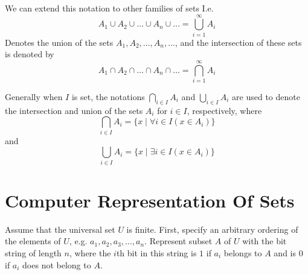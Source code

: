 \documentclass[12pt letter]{report}
\begin{document}

We can extend this notation to other families of sets I.e.
\[
	A_1 \cup A_2 \cup \ldots \cup A_n \cup \ldots = \bigcup_{i = 1} ^{\infty}A_i
\]
Denotes the union of the sets $A_1,A_2,\ldots,A_n,\ldots$, and the intersection of these sets is denoted by
\[
	A_1 \cap A_2 \cap \ldots \cap A_n \cap \ldots = \bigcap_{i = 1} ^{\infty}A_i
\]

Generally when $I$ is set, the notations $\bigcap_{i \in  I}A_i $ and $\bigcup_{i \in  I}A_i $ are used to denote the
intersection and union of the sets $A_i$ for $i \in I$, respectively, where
\[
	\bigcap_{i \in  I} A_i = \{x  \mid \forall i \in I \left( x \in A_i \right) \}
\]
and
\[
	\bigcup_{i \in  I}  A_i = \{x  \mid \exists i \in I \left( x \in A_i \right) \}
\]


\section{Computer Representation Of Sets}

Assume that the universal set $U$ is finite. First, specify an arbitrary ordering of the elements of $U$, e.g. $a_1, a_2,
	a_3, \ldots,a_n$. Represent subset $A$ of $U$ with the bit string of length $n$, where the $i$th bit in this string is
$1$ if $a_i$ belongs to $A$ and is $0$ if $a_i$ does not belong to $A$.

\end{document}
